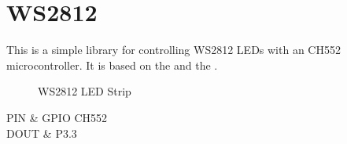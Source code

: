 \documentclass[letterpaper,10pt,english]{sphinxmanual}
\begin{document}
\sphinxstepscope


\chapter{WS2812}
\label{\detokenize{ws2812:ws2812}}\label{\detokenize{ws2812::doc}}
\sphinxAtStartPar
This is a simple library for controlling WS2812 LEDs with an CH552 microcontroller. It is based on the
 and the
.

\begin{figure}[htbp]
\centering
\capstart

\noindent{}
\caption{WS2812 LED Strip}\label{\detokenize{ws2812:id1}}\label{\detokenize{ws2812:figura-dualmcu-one}}\end{figure}


\begin{savenotes}\sphinxattablestart
\sphinxthistablewithglobalstyle
\centering
{}
\sphinxthecaptionisattop
{}\label{\detokenize{ws2812:id2}}
\sphinxaftertopcaption
\begin{tabular}[t]{}
\sphinxtoprule
\sphinxstyletheadfamily 
\sphinxAtStartPar
PIN
&\sphinxstyletheadfamily 
\sphinxAtStartPar
GPIO CH552
\\
\sphinxmidrule
\sphinxtableatstartofbodyhook
\sphinxAtStartPar
DOUT
&
\sphinxAtStartPar
P3.3
\\
\sphinxbottomrule
\end{tabular}
\sphinxtableafterendhook\par
\sphinxattableend\end{savenotes}
\end{document}
